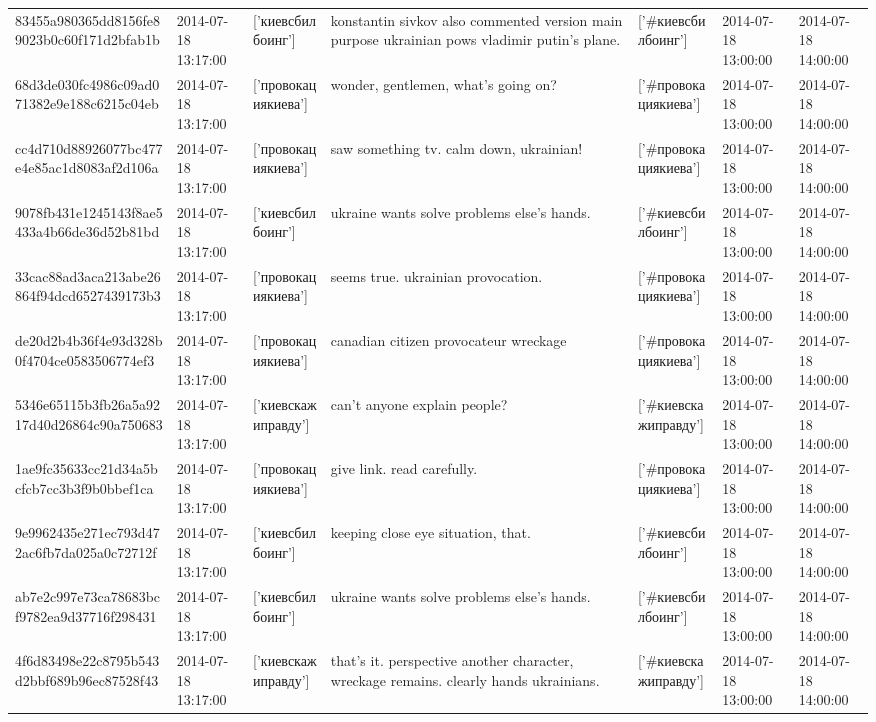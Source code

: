 \begin{tabular}{lllllll}
83455a980365dd8156fe89023b0c60f171d2bfab1b & 2014-07-18 13:17:00 & ['киевсбилбоинг'] & konstantin sivkov also commented version main purpose ukrainian pows vladimir putin's plane. & ['#киевсбилбоинг'] & 2014-07-18 13:00:00 & 2014-07-18 14:00:00 \\
68d3de030fc4986c09ad071382e9e188c6215c04eb & 2014-07-18 13:17:00 & ['провокациякиева'] & wonder, gentlemen, what's going on? & ['#провокациякиева'] & 2014-07-18 13:00:00 & 2014-07-18 14:00:00 \\
cc4d710d88926077bc477e4e85ac1d8083af2d106a & 2014-07-18 13:17:00 & ['провокациякиева'] & saw something tv. calm down, ukrainian! & ['#провокациякиева'] & 2014-07-18 13:00:00 & 2014-07-18 14:00:00 \\
9078fb431e1245143f8ae5433a4b66de36d52b81bd & 2014-07-18 13:17:00 & ['киевсбилбоинг'] & ukraine wants solve problems else's hands. & ['#киевсбилбоинг'] & 2014-07-18 13:00:00 & 2014-07-18 14:00:00 \\
33cac88ad3aca213abe26864f94dcd6527439173b3 & 2014-07-18 13:17:00 & ['провокациякиева'] & seems true. ukrainian provocation. & ['#провокациякиева'] & 2014-07-18 13:00:00 & 2014-07-18 14:00:00 \\
de20d2b4b36f4e93d328b0f4704ce0583506774ef3 & 2014-07-18 13:17:00 & ['провокациякиева'] & canadian citizen provocateur wreckage & ['#провокациякиева'] & 2014-07-18 13:00:00 & 2014-07-18 14:00:00 \\
5346e65115b3fb26a5a9217d40d26864c90a750683 & 2014-07-18 13:17:00 & ['киевскажиправду'] & can't anyone explain people? & ['#киевскажиправду'] & 2014-07-18 13:00:00 & 2014-07-18 14:00:00 \\
1ae9fc35633cc21d34a5bcfcb7cc3b3f9b0bbef1ca & 2014-07-18 13:17:00 & ['провокациякиева'] & give link. read carefully. & ['#провокациякиева'] & 2014-07-18 13:00:00 & 2014-07-18 14:00:00 \\
9e9962435e271ec793d472ac6fb7da025a0c72712f & 2014-07-18 13:17:00 & ['киевсбилбоинг'] & keeping close eye situation, that. & ['#киевсбилбоинг'] & 2014-07-18 13:00:00 & 2014-07-18 14:00:00 \\
ab7e2c997e73ca78683bcf9782ea9d37716f298431 & 2014-07-18 13:17:00 & ['киевсбилбоинг'] & ukraine wants solve problems else's hands. & ['#киевсбилбоинг'] & 2014-07-18 13:00:00 & 2014-07-18 14:00:00 \\
4f6d83498e22c8795b543d2bbf689b96ec87528f43 & 2014-07-18 13:17:00 & ['киевскажиправду'] & that's it. perspective another character, wreckage remains. clearly hands ukrainians. & ['#киевскажиправду'] & 2014-07-18 13:00:00 & 2014-07-18 14:00:00 \\

\end{tabular}
